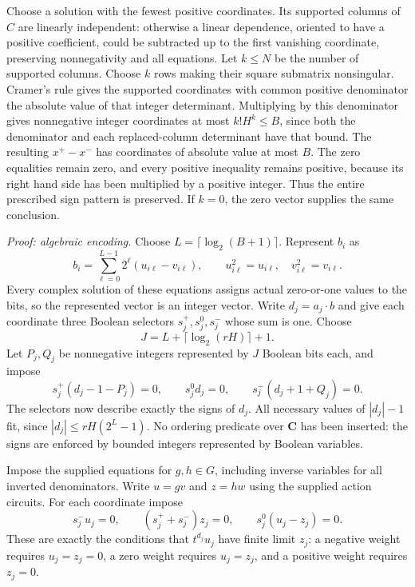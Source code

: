 \documentclass[11pt,a4paper]{article}
\begin{document}
Choose a solution with the fewest positive coordinates. Its supported
columns of $C$ are linearly independent: otherwise a linear dependence,
oriented to have a positive coefficient, could be subtracted up to the
first vanishing coordinate, preserving nonnegativity and all equations.
Let $k\le N$ be the number of supported columns. Choose $k$ rows making
their square submatrix nonsingular. Cramer's rule gives the supported
coordinates with common positive denominator the absolute value of that
integer determinant. Multiplying by this denominator gives nonnegative
integer coordinates at most $k!H^k\le B$, since both the denominator and
each replaced-column determinant have that bound. The resulting
$x^+-x^-$ has coordinates of absolute value at most $B$. The zero
equalities remain zero, and every positive inequality remains positive,
because its right hand side has been multiplied by a positive integer.
Thus the entire prescribed sign pattern is preserved. If $k=0$, the
zero vector supplies the same conclusion.

\emph{Proof: algebraic encoding.} Choose
$L=\lceil\log_2(B+1)\rceil$. Represent $b_i$ as
\[
           b_i=\sum_{\ell=0}^{L-1}2^\ell
                         (u_{i\ell}-v_{i\ell}),
        \qquad u_{i\ell}^2=u_{i\ell},\quad
               v_{i\ell}^2=v_{i\ell}.
\]
Every complex solution of these equations assigns actual zero-or-one
values to the bits, so the represented vector is an integer vector.
Write $d_j=a_j\cdot b$ and give each coordinate three Boolean selectors
$s_j^+,s_j^0,s_j^-$ whose sum is one. Choose
\[
       J=L+\lceil\log_2(rH)\rceil+1.
\]
Let $P_j,Q_j$ be nonnegative integers represented by $J$ Boolean bits
each, and impose
\[
 s_j^+(d_j-1-P_j)=0,\qquad
 s_j^0d_j=0,\qquad s_j^-(d_j+1+Q_j)=0.
\]
The selectors now describe exactly the signs of $d_j$. All necessary
values of $|d_j|-1$ fit, since $|d_j|\le rH(2^L-1)$.
No ordering predicate over $\mathbf C$ has been inserted: the signs
are enforced by bounded integers represented by Boolean variables.

Impose the supplied equations for $g,h\in G$, including inverse
variables for all inverted denominators. Write $u=gv$ and $z=hw$ using
the supplied action circuits. For each coordinate impose
\[
              s_j^-u_j=0,\qquad
              (s_j^++s_j^-)z_j=0,\qquad
              s_j^0(u_j-z_j)=0.
\]
These are exactly the conditions that $t^{d_j}u_j$ have finite limit
$z_j$: a negative weight requires $u_j=z_j=0$, a zero weight requires
$u_j=z_j$, and a positive weight requires $z_j=0$.
\end{document}
